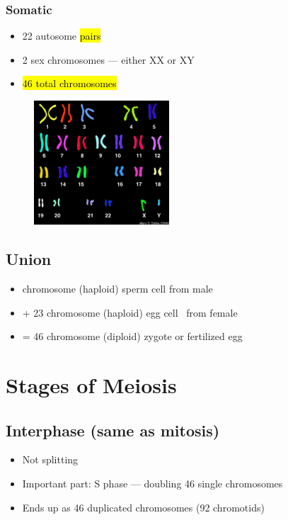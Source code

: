 \documentclass[a4paper,12pt]{article}
\begin{document}
\subsubsection{Somatic}
\begin{itemize}
    \item{22 autosome \hl{pairs}}
    \item{2 sex chromosomes --- either \female XX or \male XY}
    \item{\hl{46 total chromosomes}}
\end{itemize}

\begin{figure}[H]
    \centering
    \includegraphics[width=0.45\textwidth]{46}
\end{figure}

\subsection{Union}
\begin{itemize}
    \item{\;\;\; chromosome (haploid) sperm cell from \male\! male}
    \item{+ 23 chromosome (haploid) egg cell \;\;\,\,\,from \female\! female}
    \item{= 46 chromosome (diploid) zygote or fertilized egg}
\end{itemize}

\section{Stages of Meiosis}

\subsection{Interphase (same as mitosis)}
\begin{itemize}
    \item{Not splitting}
    \item{Important part: S phase --- doubling 46 single chromosomes}
    \item{Ends up as 46 duplicated chromosomes (92 chromotids)}
\end{itemize}
\end{document}
